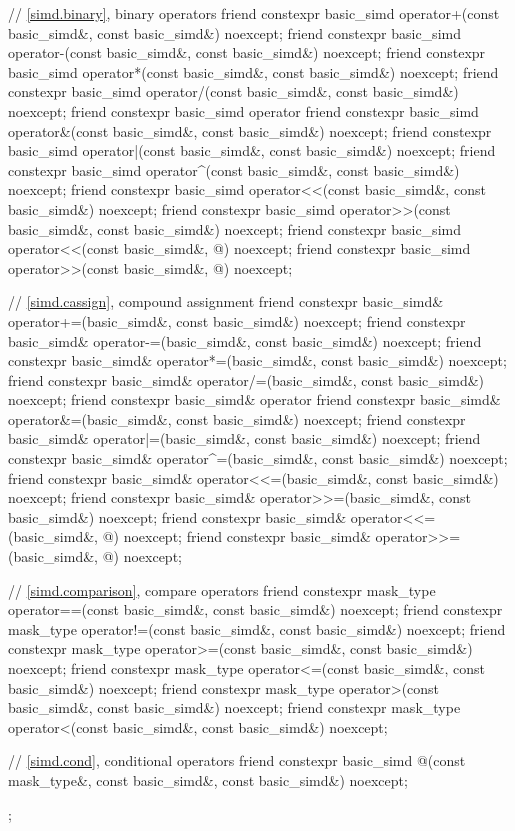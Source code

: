 \begin{codeblock}
{  // \ref{simd.binary},  binary operators
  friend constexpr basic_simd operator+(const basic_simd&, const basic_simd&) noexcept;
  friend constexpr basic_simd operator-(const basic_simd&, const basic_simd&) noexcept;
  friend constexpr basic_simd operator*(const basic_simd&, const basic_simd&) noexcept;
  friend constexpr basic_simd operator/(const basic_simd&, const basic_simd&) noexcept;
  friend constexpr basic_simd operator%
  friend constexpr basic_simd operator&(const basic_simd&, const basic_simd&) noexcept;
  friend constexpr basic_simd operator|(const basic_simd&, const basic_simd&) noexcept;
  friend constexpr basic_simd operator^(const basic_simd&, const basic_simd&) noexcept;
  friend constexpr basic_simd operator<<(const basic_simd&, const basic_simd&) noexcept;
  friend constexpr basic_simd operator>>(const basic_simd&, const basic_simd&) noexcept;
  friend constexpr basic_simd operator<<(const basic_simd&, @\simdsizetype@) noexcept;
  friend constexpr basic_simd operator>>(const basic_simd&, @\simdsizetype@) noexcept;

  // \ref{simd.cassign},  compound assignment
  friend constexpr basic_simd& operator+=(basic_simd&, const basic_simd&) noexcept;
  friend constexpr basic_simd& operator-=(basic_simd&, const basic_simd&) noexcept;
  friend constexpr basic_simd& operator*=(basic_simd&, const basic_simd&) noexcept;
  friend constexpr basic_simd& operator/=(basic_simd&, const basic_simd&) noexcept;
  friend constexpr basic_simd& operator%
  friend constexpr basic_simd& operator&=(basic_simd&, const basic_simd&) noexcept;
  friend constexpr basic_simd& operator|=(basic_simd&, const basic_simd&) noexcept;
  friend constexpr basic_simd& operator^=(basic_simd&, const basic_simd&) noexcept;
  friend constexpr basic_simd& operator<<=(basic_simd&, const basic_simd&) noexcept;
  friend constexpr basic_simd& operator>>=(basic_simd&, const basic_simd&) noexcept;
  friend constexpr basic_simd& operator<<=(basic_simd&, @\simdsizetype@) noexcept;
  friend constexpr basic_simd& operator>>=(basic_simd&, @\simdsizetype@) noexcept;

  // \ref{simd.comparison},  compare operators
  friend constexpr mask_type operator==(const basic_simd&, const basic_simd&) noexcept;
  friend constexpr mask_type operator!=(const basic_simd&, const basic_simd&) noexcept;
  friend constexpr mask_type operator>=(const basic_simd&, const basic_simd&) noexcept;
  friend constexpr mask_type operator<=(const basic_simd&, const basic_simd&) noexcept;
  friend constexpr mask_type operator>(const basic_simd&, const basic_simd&) noexcept;
  friend constexpr mask_type operator<(const basic_simd&, const basic_simd&) noexcept;

  // \ref{simd.cond},  conditional operators
  friend constexpr basic_simd @\simdselect@(const mask_type&, const basic_simd&, const basic_simd&) noexcept;
};
\end{codeblock}

